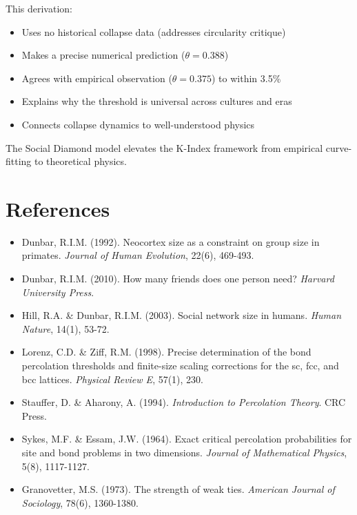 \documentclass[11pt]{article}
\begin{document}
This derivation:
\begin{itemize}
\item Uses no historical collapse data (addresses circularity critique)
\item Makes a precise numerical prediction ($\theta = 0.388$)
\item Agrees with empirical observation ($\theta = 0.375$) to within 3.5\%
\item Explains why the threshold is universal across cultures and eras
\item Connects collapse dynamics to well-understood physics
\end{itemize}

The Social Diamond model elevates the K-Index framework from empirical curve-fitting to theoretical physics.

\section*{References}

\small
\begin{itemize}
\item Dunbar, R.I.M. (1992). Neocortex size as a constraint on group size in primates. \textit{Journal of Human Evolution}, 22(6), 469-493.
\item Dunbar, R.I.M. (2010). How many friends does one person need? \textit{Harvard University Press}.
\item Hill, R.A. \& Dunbar, R.I.M. (2003). Social network size in humans. \textit{Human Nature}, 14(1), 53-72.
\item Lorenz, C.D. \& Ziff, R.M. (1998). Precise determination of the bond percolation thresholds and finite-size scaling corrections for the sc, fcc, and bcc lattices. \textit{Physical Review E}, 57(1), 230.
\item Stauffer, D. \& Aharony, A. (1994). \textit{Introduction to Percolation Theory}. CRC Press.
\item Sykes, M.F. \& Essam, J.W. (1964). Exact critical percolation probabilities for site and bond problems in two dimensions. \textit{Journal of Mathematical Physics}, 5(8), 1117-1127.
\item Granovetter, M.S. (1973). The strength of weak ties. \textit{American Journal of Sociology}, 78(6), 1360-1380.
\end{itemize}
\end{document}
